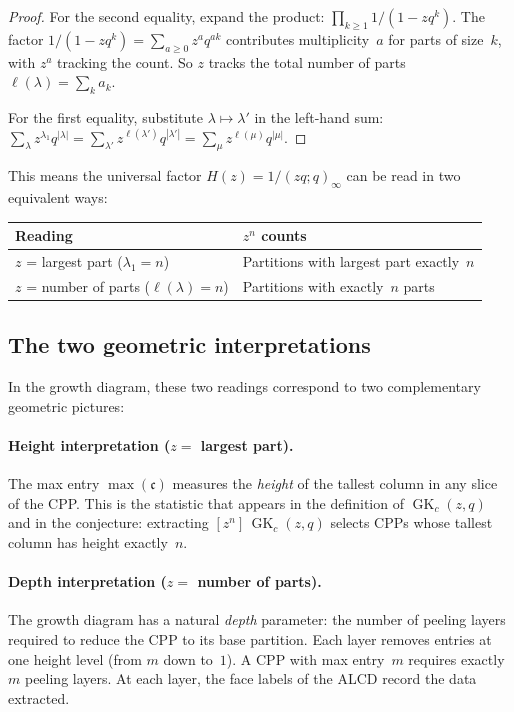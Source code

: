 \documentclass[11pt]{article}
\newcommand{\GK}{\operatorname{GK}}
\newcommand{\qpoch}[2]{(#1;#2)_\infty}
\theoremstyle{plain}
\theoremstyle{definition}
\begin{document}
\begin{proof}
For the second equality, expand the product:
$\prod_{k \geq 1} 1/(1-zq^k)$.
The factor $1/(1-zq^k) = \sum_{a \geq 0} z^a q^{ak}$ contributes
multiplicity~$a$ for parts of size~$k$, with $z^a$ tracking the count.
So $z$ tracks the total number of parts $\ell(\lambda) = \sum_k a_k$.

For the first equality, substitute $\lambda \mapsto \lambda'$ in the
left-hand sum: $\sum_\lambda z^{\lambda_1} q^{|\lambda|}
= \sum_{\lambda'} z^{\ell(\lambda')} q^{|\lambda'|}
= \sum_\mu z^{\ell(\mu)} q^{|\mu|}$.
\end{proof}

This means the universal factor $H(z) = 1/\qpoch{zq}{q}$ can be read
in two equivalent ways:
\begin{center}
\begin{tabular}{l|l}
\textbf{Reading} & \textbf{$z^n$ counts} \\ \hline
$z$ = largest part ($\lambda_1 = n$)
  & Partitions with largest part exactly~$n$ \\[2pt]
$z$ = number of parts ($\ell(\lambda) = n$)
  & Partitions with exactly~$n$ parts
\end{tabular}
\end{center}

\subsection{The two geometric interpretations}

In the growth diagram, these two readings correspond to two
complementary geometric pictures:

\paragraph{Height interpretation ($z = $ largest part).}
The max entry $\max(\mathfrak{c})$ measures the \emph{height} of
the tallest column in any slice of the CPP.  This is the statistic
that appears in the definition of $\GK_c(z,q)$ and in the conjecture:
extracting $[z^n]\,\GK_c(z,q)$ selects CPPs whose tallest column has
height exactly~$n$.

\paragraph{Depth interpretation ($z = $ number of parts).}
The growth diagram has a natural \emph{depth} parameter: the number of
peeling layers required to reduce the CPP to its base partition.  Each
layer removes entries at one height level (from $m$ down to~$1$).  A CPP
with max entry~$m$ requires exactly~$m$ peeling layers.  At each layer,
the face labels of the ALCD record the data extracted.
\end{document}
